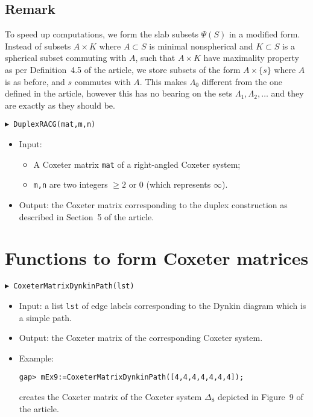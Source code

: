 \documentclass[10pt]{amsart}
\begin{document}
\subsection*{Remark} To speed up computations, we form the slab subsets $\Psi(S)$ in a modified form. Instead of subsets $A\times K$ where $A\subset S$ is minimal nonspherical and $K\subset S$ is a spherical subset commuting with $A$, such that $A\times K$ have maximality property as per Definition~4.5 of the article, we store subsets of the form $A\times\{s\}$ where $A$ is as before, and $s$ commutes with $A$. This makes $\Lambda_0$ different from the one defined in the article, however this has no bearing on the sets $\Lambda_1,\Lambda_2,\dots$ and they are exactly as they should be.

\bigskip\noindent
{\tt $\blacktriangleright$ DuplexRACG(mat,m,n)}
\noindent 
\begin{itemize}
\item{} Input: 
	\begin{itemize}
	\item A Coxeter matrix {\tt mat} of a right-angled Coxeter system;
	\item {\tt m,n} are two integers $\ge 2$ or $0$ (which represents $\infty$).
	\end{itemize}
\item{} Output: the Coxeter matrix corresponding to the duplex construction as described in Section~5 of the article.
\end{itemize}



\section{Functions to form Coxeter matrices}

\noindent
{\tt $\blacktriangleright$ CoxeterMatrixDynkinPath(lst)}
\noindent 
\begin{itemize}
\item{} Input: a list {\tt lst} of edge labels corresponding to the Dynkin diagram which is a simple path.
\item{} Output: the Coxeter matrix of the corresponding Coxeter system.
\item Example: 

\noindent
\verb+gap> mEx9:=CoxeterMatrixDynkinPath([4,4,4,4,4,4,4]);+

\noindent
creates the Coxeter matrix of the Coxeter system $\Delta_8$ depicted in Figure~9 of the article.
\end{itemize}
\end{document}
